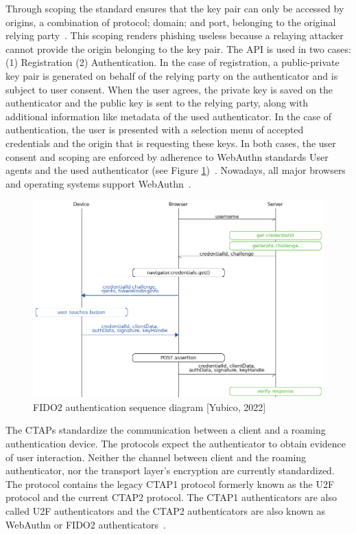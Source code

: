 \documentclass[runningheads]{llncs}
\begin{document}
Through scoping the standard ensures that the key pair can only be accessed by origins, a combination of protocol; domain; and port, belonging to the original relying party~\cite{274610}. This scoping renders phishing useless because a relaying attacker cannot provide the origin belonging to the key pair. The API is used in two cases: (1) Registration (2) Authentication. In the case of registration, a public-private key pair is generated on behalf of the relying party on the authenticator and is subject to user consent. When the user agrees, the private key is saved on the authenticator and the public key is sent to the relying party, along with additional information like metadata of the used authenticator. In the case of authentication, the user is presented with a selection menu of accepted credentials and the origin that is requesting these keys. In both cases, the user consent and scoping are enforced by adherence to WebAuthn standards User agents and the used authenticator (see Figure \ref{figure_one})~\cite{000002}. Nowadays, all major browsers and operating systems support WebAuthn~\cite{000001}.

\begin{figure}[ht]
  \centering
  \includegraphics[width=\textwidth]{references/fido_flow_by_yubico.png}
  \caption{FIDO2 authentication sequence diagram [Yubico, 2022]}
  \label{figure_one}
\end{figure}

The CTAPs standardize the communication between a client and a roaming authentication device. The protocols expect the authenticator to obtain evidence of user interaction. Neither the channel between client and the roaming authenticator, nor the transport layer's encryption are currently standardized. The protocol contains the legacy CTAP1 protocol formerly known as the U2F protocol and the current CTAP2 protocol. The CTAP1 authenticators are also called U2F authenticators and the CTAP2 authenticators are also known as WebAuthn or FIDO2 authenticators~\cite{000003,274547,9099190}.
\end{document}
